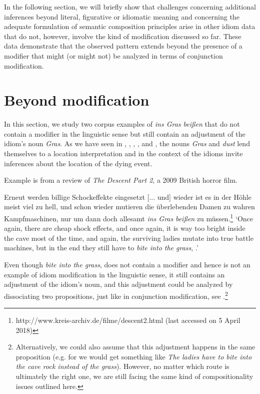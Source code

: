 \documentclass[output=paper]{langsci/langscibook}
\begin{document}
In the following section, we will briefly show that challenges concerning additional inferences beyond literal, figurative or idiomatic meaning and concerning the adequate formulation of semantic composition principles arise in other idiom data that do not, however, involve the kind of modification discussed so far. These data demonstrate that the observed pattern extends beyond the presence of a modifier that might (or might not) be analyzed in terms of conjunction modification.



\section{Beyond modification} \label{Beyond Mod}

In this section, we study two corpus examples of \textit{ins Gras beißen} that do not contain a modifier in the linguistic sense but still contain an adjustment of the idiom's noun \textit{Gras}. As we have seen in , , , , and , the nouns \textit{Gras} and \textit{dust} lend themselves to a location interpretation and in the context of the idioms invite inferences about the location of the dying event.

Example  is from a review of \textit{The Descent Part 2}, a 2009 British horror film.

\ea \label{cave rock}
Erneut werden billige Schockeffekte eingesetzt [... und] wieder ist es in der Höhle meist viel zu hell, und schon wieder mutieren die überlebenden Damen zu wahren Kampfmaschinen, nur um dann doch allesamt \textit{ins Gras} \underline{} \textit{beißen} zu müssen.\footnote{http://www.kreis-archiv.de/filme/descent2.html (last accessed on 5 April 2018)}
\vspace{5pt}
\glt `Once again, there are cheap shock effects, and once again, it is way too bright inside the cave most of the time, and again, the surviving ladies mutate into true battle machines, but in the end they still have to \textit{bite into the grass}, \underline{}.'
\z

\noindent Even though \textit{bite into the grass}, \underline{} does not contain a modifier and hence is not an example of idiom modification in the linguistic sense, it still contains an adjustment of the idiom's noun, and this adjustment could be analyzed by dissociating two propositions, just like in conjunction modification, see .\footnote{Alternatively, we could also assume that this adjustment happens in the same proposition (e.g. for  we would get something like \textit{The ladies have to bite into the cave rock instead of the grass}). However, no matter which route is ultimately the right one, we are still facing the same kind of compositionality issues outlined here.}
\end{document}
